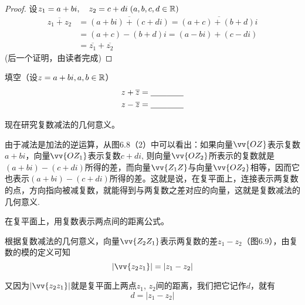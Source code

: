\begin{proof}
    设$z_1=a+bi,\quad z_2=c+di\; (a,b,c,d\in \mathbb{R})$
\[\begin{split}
    \overline{z_{1}+z_{2}}&=\overline{(a+bi)+(c+di)}=\overline{(a+c)+(b+d)i}\\
    &=(a+c)-(b+d)i=(a-bi)+(c-di)\\
    &=\overline{z_{1}}+\overline{z_{2}}
\end{split}\]
(后一个证明，由读者完成)
\end{proof}

\begin{example}
    填空（设$z=a+bi,a,b\in \mathbb{R}$）
\[\begin{split}
    z+\overline{z}&=\underline{\qquad}\underline{\qquad}\\
    z-\overline{z}&=\underline{\qquad}\underline{\qquad}
\end{split}\]
\end{example}

现在研究复数减法的几何意义。

由于减法是加法的逆运算，从图6.8（2）中可以看出：如果向量$\vv{OZ}$表示复数$a+bi$，向量$\vv{OZ_1}$表示复数$c+di$,
则向量$\vv{OZ_2}$所表示的复数就是$(a+bi)-(c+di)$所得的差，而向量$\vv{Z_1Z}$与向量$\vv{OZ_2}$相等，因而它也表示$(a+bi)-(c+di)$所得的差。这就是说，在复平面上，连接表示两复数的点，方向指向被减复数，就能得到与两复数之差对应的向量，这就是复数减法的几何意义.

\begin{example}
    在复平面上，用复数表示两点间的距离公式。
\end{example}

\noindent
\begin{minipage}{.48\textwidth}
\CTEXindent
    \begin{solution}
    根据复数减法的几何意义，向量$\vv{Z_2Z_1}$表示两复数的差$z_1-z_2$（图6.9），由复数的模的定义可知
\[    |\vv{z_2z_1}|=|z_1-z_2|\]

又因为$|\vv{z_2z_1}|$就是复平面上两点$z_1$, $z_2$间的距离，我们把它记作$d$，就有
  \[  d=|z_1-z_2|\]

\end{solution}
\end{minipage}\hfill
\begin{minipage}{.5\textwidth}
\centering
{}
\end{minipage}

